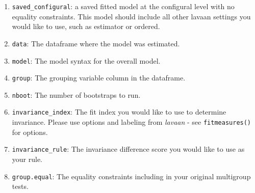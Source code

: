 \documentclass[
  man]{apa7}
\newenvironment{Shaded}{\begin{snugshade}}{\end{snugshade}}
\newcommand{\AttributeTok}[1]{\textcolor[rgb]{0.13,0.29,0.53}{#1}}
\newcommand{\CommentTok}[1]{\textcolor[rgb]{0.56,0.35,0.01}{\textit{#1}}}
\newcommand{\DecValTok}[1]{\textcolor[rgb]{0.00,0.00,0.81}{#1}}
\newcommand{\FunctionTok}[1]{\textcolor[rgb]{0.13,0.29,0.53}{\textbf{#1}}}
\newcommand{\NormalTok}[1]{#1}
\newcommand{\OtherTok}[1]{\textcolor[rgb]{0.56,0.35,0.01}{#1}}
\newcommand{\SpecialCharTok}[1]{\textcolor[rgb]{0.81,0.36,0.00}{\textbf{#1}}}
\newcommand{\StringTok}[1]{\textcolor[rgb]{0.31,0.60,0.02}{#1}}
\providecommand{\tightlist}{%
  \setlength{\itemsep}{0pt}\setlength{\parskip}{0pt}}
\begin{document}
\begin{enumerate}
\def\labelenumi{\arabic{enumi})}
\tightlist
\item
  \texttt{saved\_configural}: a saved fitted model at the configural level with no equality constraints. This model should include all other lavaan settings you would like to use, such as estimator or ordered.
\item
  \texttt{data}: The dataframe where the model was estimated.
\item
  \texttt{model}: The model syntax for the overall model.
\item
  \texttt{group}: The grouping variable column in the dataframe.
\item
  \texttt{nboot}: The number of bootstraps to run.
\item
  \texttt{invariance\_index}: The fit index you would like to use to determine invariance. Please use options and labeling from \emph{lavaan} - see \texttt{fitmeasures()} for options.
\item
  \texttt{invariance\_rule}: The invariance difference score you would like to use as your rule.
\item
  \texttt{group.equal}: The equality constraints including in your original multigroup tests.
\end{enumerate}

\small

\begin{Shaded}
\end{Shaded}
\end{document}
